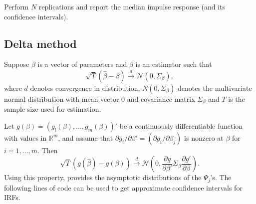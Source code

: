 \documentclass[
  12pt,
]{book}
\theoremstyle{definition}
\theoremstyle{definition}
\theoremstyle{definition}
\theoremstyle{definition}
\theoremstyle{remark}
\begin{document}
Perform \(N\) replications and report the median impulse response (and its confidence intervals).

\hypertarget{Delta}{%
\subsection{Delta method}\label{Delta}}

Suppose \(\beta\) is a vector of parameters and \(\beta\) is an estimator such that
\[
\sqrt{T}(\hat\beta-\beta)\overset{d}{\rightarrow}\mathcal{N}(0,\Sigma_\beta),
\]
where \(d\) denotes convergence in distribution, \(N(0,\Sigma_\beta)\) denotes the multivariate normal distribution with mean vector 0 and covariance matrix \(\Sigma_\beta\) and \(T\) is the sample size used for estimation.

Let \(g(\beta) = (g_l(\beta),..., g_m(\beta))'\) be a continuously differentiable function with values in \(\mathbb{R}^m\), and assume that \(\partial g_i/\partial \beta' = (\partial g_i/\partial \beta_j)\) is nonzero at \(\beta\) for \(i = 1,\dots, m\). Then
\[
\sqrt{T}(g(\hat\beta)-g(\beta))\overset{d}{\rightarrow}\mathcal{N}\left(0,\frac{\partial g}{\partial \beta'}\Sigma_\beta\frac{\partial g'}{\partial \beta}\right).
\]
Using this property, \citet{Lutkepohl_1990} provides the asymptotic distributions of the \(\Psi_j\)'s. The following lines of code can be used to get approximate confidence intervals for IRFs.
\end{document}
